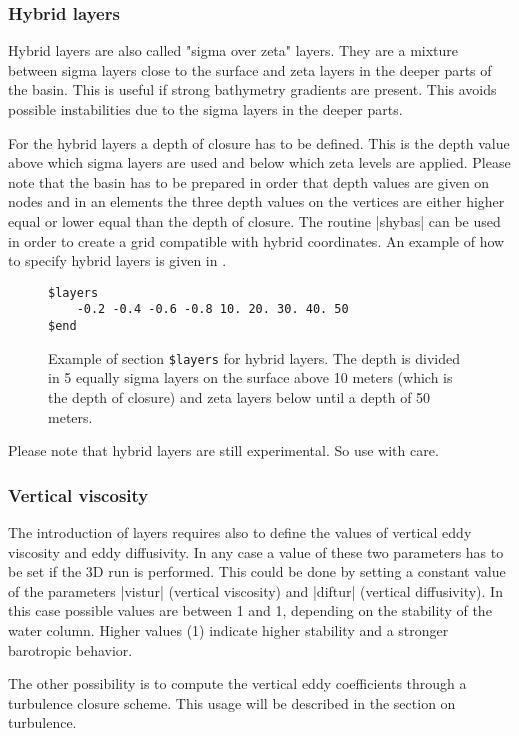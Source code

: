 \subsubsection{Hybrid layers}

Hybrid layers are also called "sigma over zeta" layers. They are a
mixture between sigma layers close to the surface and zeta layers in
the deeper parts of the basin. This is useful if strong bathymetry
gradients are present. This avoids possible instabilities due to the
sigma layers in the deeper parts.

For the hybrid layers a depth of closure has to be defined. This is the
depth value above which sigma layers are used and below which zeta levels
are applied. Please note that the basin has to be prepared in order that
depth values are given on nodes and in an elements the three depth values
on the vertices are either higher equal or lower equal than the depth
of closure. The routine |shybas| can be used in order to create
a grid compatible with hybrid coordinates. An example of how
to specify hybrid layers is given in
\Fig{}.

\begin{figure}[ht]
\begin{verbatim}
$layers
	-0.2 -0.4 -0.6 -0.8 10. 20. 30. 40. 50
$end
\end{verbatim}
\caption{Example of section {\tt \$layers} for hybrid layers.
The depth is divided in 5 equally sigma layers on the surface above 10 meters
(which is the depth of closure) and zeta layers below until a depth
of 50 meters.}
\label{fig:hlayers}
\end{figure}

Please note that hybrid layers are still experimental. So use with care.




\subsubsection{Vertical viscosity}

The introduction of layers requires also to define the values of
vertical eddy viscosity and eddy diffusivity.  In any case a value of
these two parameters has to be set if the 3D run is performed. This
could be done by setting a constant value of the parameters |vistur|
(vertical viscosity) and |diftur| (vertical diffusivity). In this case
possible values are between 1 and 1, depending on the
stability of the water column. Higher values (1) indicate higher
stability and a stronger barotropic behavior.

The other possibility is to compute the vertical eddy coefficients through
a turbulence closure scheme. This usage will be described in the section
on turbulence.



